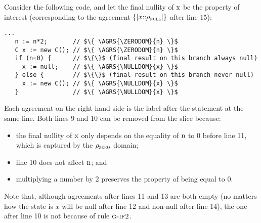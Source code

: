 \documentclass[prodmode,acmtocl]{acmsmall}
\def\uco{\ensuremath{\rho}\xspace}
\newcommand{\0}{\mbox{\bf 0}}
\newcommand{\CODE}[1]{\ensuremath{\mbox{\lstinline!#1!}\xspace}\xspace}
\def\xx{\CODE{x}}
\def\nn{\CODE{n}}
\def\ZERODOM{\ensuremath{\uco_{\textsc{zero}}}\xspace}
\def\NULLDOM{\ensuremath{\uco_{\textsc{null}}}\xspace}
\newcommand{\AGRS}[2]{[#2{::}#1]}
\newcommand{\GRULENAME}[1]{\textsc{g-#1}}
\begin{document}
\begin{example}
  \label{ex:conditionsToSlice}
  Consider the following code, and let the final nullity of \xx be the
  property of interest (corresponding to the agreement $\{
  \AGRS{\NULLDOM}{x} \}$ after line 15): {\em
        \begin{lstlisting}[firstnumber=8]
   ...
   n := n*2;       // $\{ \AGRS{\ZERODOM}{n} \}$
   C x := new C(); // $\{ \AGRS{\ZERODOM}{n} \}$
   if (n=0) {      // $\{\}$ (final result on this branch always null)
     x := null;    // $\{ \AGRS{\NULLDOM}{x} \}$
   } else {        // $\{\}$ (final result on this branch never null)
     x := new C(); // $\{ \AGRS{\NULLDOM}{x} \}$
   }               // $\{ \AGRS{\NULLDOM}{x} \}$
      \end{lstlisting}
      }
  \noindent
  Each agreement on the right-hand side is the label after the
  statement at the same line.  Both lines $9$ and $10$ can be removed
  from the slice because:
  \begin{itemize}
  \item the final nullity of \xx only depends on the equality of \nn
    to $0$ before line 11, which is captured by the $\ZERODOM$ domain;
  \item line 10 does not affect \nn; and
  \item multiplying a number by 2 preserves the property of being
    equal to $0$.
  \end{itemize}
  Note that, although agreements after lines 11 and 13 are both empty
  (no matters how the state is $x$ will be null after line 12 and
  non-null after line 14), the one after line 10 is not because of
  rule $\GRULENAME{if2}$.
\end{example}
\end{document}
